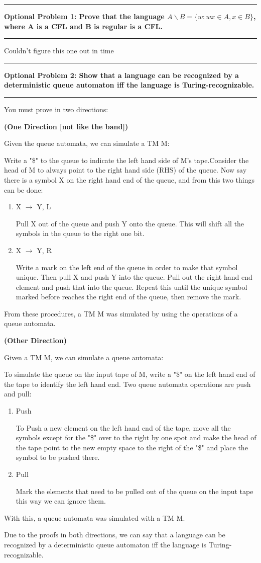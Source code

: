 \documentclass[11pt]{article}
\newcommand\question[2]{\vspace{.25in}\hrule\textbf{#1: #2}\vspace{.5em}\hrule\vspace{.10in}}
\renewcommand\part[1]{\vspace{.10in}\textbf{(#1)}\par}
\begin{document}
\question{Optional Problem 1} {Prove that the language $A\backslash B=\{w:wx \in A, x\in B\}$, where A is a CFL and B is regular is a CFL.}
	Couldn't figure this one out in time
	
\question{Optional Problem 2}{Show that a language can be recognized by a deterministic queue automaton iff the language is Turing-recognizable.}
	You must prove in two directions:\par
	\part{One Direction [not like the band]}
		Given the queue automata, we can simulate a TM M:\par
		Write a "\$" to the queue to indicate the left hand side of M's tape.Consider the head of M to always point to the right hand side (RHS) of the queue. Now say there is a symbol X on the right hand end of the queue, and from this two things can be done:
		\begin{enumerate}
			\item X $\rightarrow$ Y, L\par
				Pull X out of the queue and push Y onto the queue. This will shift all the symbols in the queue to the right one bit.
			\item X $\rightarrow$ Y, R\par
				Write a mark on the left end of the queue in order to make that symbol unique. Then pull X and push Y into the queue. Pull out the right hand end element and push that into the queue. Repeat this until the unique symbol marked before reaches the right end of the queue, then remove the mark. 
		\end{enumerate}
		From these procedures, a TM M was simulated by using the operations of a queue automata.
		
	\part{Other Direction}
		Given a TM M, we can simulate a queue automata:\par
		To simulate the queue on the input tape of M, write a "\$" on the left hand end of the tape to identify the left hand end. Two queue automata operations are push and pull:
		\begin{enumerate}
			\item Push\par
				To Push a new element on the left hand end of the tape, move all the symbols except for the "\$" over to the right by one spot and make the head of the tape point to the new empty space to the right of the "\$" and place the symbol to be pushed there.
			\item Pull\par
				Mark the elements that need to be pulled out of the queue on the input tape this way we can ignore them.
		\end{enumerate}
		With this, a queue automata was simulated with a TM M. \par\par
		
		Due to the proofs in both directions, we can say that a language can be recognized by a deterministic queue automaton iff the language is Turing-recognizable.








	
\end{document}
